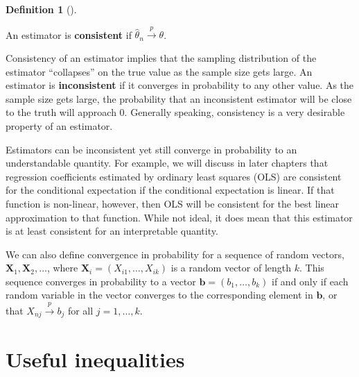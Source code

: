 \documentclass[
  letterpaper,
  DIV=11,
  numbers=noendperiod]{scrreprt}
\newcommand{\mb}{\symbf}
\newcommand{\X}{\mb{X}}
\newcommand{\inprob}{\overset{p}{\to}}
\theoremstyle{plain}
\theoremstyle{definition}
\newtheorem{definition}{Definition}[chapter]
\theoremstyle{definition}
\theoremstyle{remark}
\begin{document}
\begin{definition}[]\protect\hypertarget{def-consistency}{}\label{def-consistency}

An estimator is \textbf{consistent} if
\(\widehat{\theta}_n \inprob \theta\).

\end{definition}

Consistency of an estimator implies that the sampling distribution of
the estimator ``collapses'' on the true value as the sample size gets
large. An estimator is \textbf{inconsistent} if it converges in
probability to any other value. As the sample size gets large, the
probability that an inconsistent estimator will be close to the truth
will approach 0. Generally speaking, consistency is a very desirable
property of an estimator.

\begin{tcolorbox}[enhanced jigsaw, leftrule=.75mm, left=2mm, colbacktitle=quarto-callout-note-color!10!white, toptitle=1mm, toprule=.15mm, colframe=quarto-callout-note-color-frame, arc=.35mm, colback=white, opacitybacktitle=0.6, breakable, bottomtitle=1mm, coltitle=black, titlerule=0mm, title=\textcolor{quarto-callout-note-color}{\faInfo}\hspace{0.5em}{Note}, opacityback=0, rightrule=.15mm, bottomrule=.15mm]

Estimators can be inconsistent yet still converge in probability to an
understandable quantity. For example, we will discuss in later chapters
that regression coefficients estimated by ordinary least squares (OLS)
are consistent for the conditional expectation if the conditional
expectation is linear. If that function is non-linear, however, then OLS
will be consistent for the best linear approximation to that function.
While not ideal, it does mean that this estimator is at least consistent
for an interpretable quantity.

\end{tcolorbox}

We can also define convergence in probability for a sequence of random
vectors, \(\X_1, \X_2, \ldots\), where
\(\X_i = (X_{i1}, \ldots, X_{ik})\) is a random vector of length \(k\).
This sequence converges in probability to a vector
\(\mb{b} = (b_1, \ldots, b_k)\) if and only if each random variable in
the vector converges to the corresponding element in \(\mb{b}\), or that
\(X_{nj} \inprob b_j\) for all \(j = 1, \ldots, k\).

\hypertarget{useful-inequalities}{%
\section{Useful inequalities}\label{useful-inequalities}}
\end{document}
